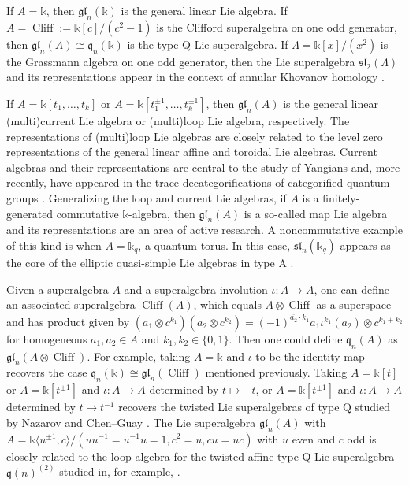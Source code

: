 \documentclass[11pt,reqno]{amsart} %
\newcommand{\gl}{\mathfrak{gl}}
\renewcommand{\k}{\mathds{k}}
\newcommand{\0}{\bar{0}}
\newcommand{\1}{\bar{1}}
\newcommand{\parity}[1]{\overline{#1}}
\newcommand{\Cliff}{\operatorname{Cliff}}
\newcommand{\fq}{\mathfrak{q}}
\numberwithin{equation}{subsection}
\begin{document}
If $A= \k$, then $\gl_{n}(\k)$ is the general linear Lie algebra.  If $A = \Cliff:=\k[c]/(c^{2}-1)$ is the Clifford superalgebra on one odd generator, then $\gl_{n}(A) \cong \fq_{n}(\k)$ is the type Q Lie superalgebra. If $\Lambda = \k [x]/(x^{2})$ is the Grassmann algebra on one odd generator, then the Lie superalgebra $\mathfrak{sl}_{2}(\Lambda)$ and its representations appear in the context of annular Khovanov homology \cite{GrigsbyLicataWehrli}.

If $A = \k[t_{1}, \dotsc , t_{k}]$ or $A = \k[t_{1}^{\pm 1}, \dotsc , t_{k}^{\pm 1}]$, then $\gl_{n}(A)$ is the general linear (multi)current Lie algebra or (multi)loop Lie algebra, respectively.  The representations of (multi)loop Lie algebras are closely related to the level zero representations of the general linear affine and toroidal Lie algebras.  Current algebras and their representations are central to the study of Yangians and, more recently, have appeared in the trace decategorifications of categorified quantum groups \cite{MolevBook,BHLW,SVV}.  Generalizing the loop and current Lie algebras, if $A$ is a finitely-generated commutative $\k$-algebra, then $\gl_{n}(A)$ is a so-called map Lie algebra and its representations are an area of active research.  A noncommutative example of this kind is when $A = \k_{q}$, a quantum torus. In this case, $\mathfrak{sl}_{n}(\k_{q})$ appears as the core of the elliptic quasi-simple Lie algebras in type A \cite{BGK}. 

Given a superalgebra $A$ and a superalgebra involution $\iota: A \to A$, one can define an associated superalgebra $\Cliff (A)$, which equals $A \otimes \Cliff$ as a superspace and has product given by $(a_{1} \otimes c^{k_{1}})(a_{2} \otimes  c^{k_{2}}) = (-1)^{\parity{a_{2}} \cdot \parity{k_{1}}} a_{1}\iota^{k_{1}}(a_{2}) \otimes c^{k_{1}+k_{2}}$ for homogeneous $a_{1}, a_{2} \in A$ and $k_{1}, k_{2} \in \{0,1 \}$.  Then one could define $\fq_{n}(A)$ as $\gl_{n}\left( A \otimes \Cliff \right)$.  For example, taking $A = \k$ and $\iota$ to be the identity map recovers the case $\mathfrak{q}_{n}(\k ) \cong \gl_{n}(\Cliff)$ mentioned previously.  Taking $A = \k [t]$ or $A = \k [t^{\pm 1}]$ and $\iota: A \to A$ determined by $t \mapsto -t$, or $A = \k [t^{\pm 1}]$ and $\iota: A \to A$ determined by $t \mapsto t^{-1}$ recovers the twisted Lie superalgebras of type Q studied by Nazarov \cite{Nazarov} and Chen--Guay \cite{ChenGuay}.  The Lie superalgebra $\gl_{n}(A)$ with $A = \k\langle u^{\pm 1},c \rangle /(uu^{-1}=u^{-1}u=1, c^{2}=u, cu=uc)$ with $u$ even and $c$ odd is closely related to the loop algebra for the twisted affine type Q Lie superalgebra $\mathfrak{q}(n)^{(2)}$ studied in, for example, \cite{HoytSerganova,GorelikSerganova}. 
\end{document}
